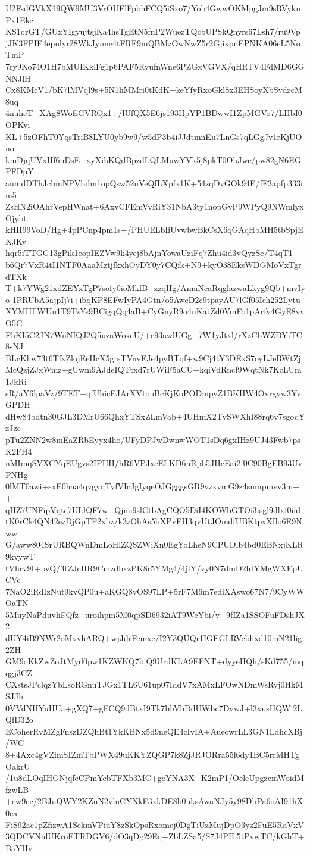 U2FsdGVkX19QW9MU3VrOUFlFpbhFCQ5iSxo7/Yob4GwwOKMpgJm9sRVykuPx1Ekc
KS1qrGT/GUxYIgyujtsjKa4hsTgEtN5fnP2WuezTQcbUPSkQnyrs67Lsh7/ru9Vp
jJK3FPIF4epulyr28WkJynne4tFRF9mQBMzOwNwZ5r2GjixpnEPNKA06eL5NoTmP
7ry9Ko74O1H7bMUIKklFg1p6PAF5RyufnWne6PZGxVGVX/qHRTV4FdMD6GGNNJlH
Cx8KMcV1/bK7lMVql9s+5N1hMMri0tKdK+keYfyRxoGkl8x3EHSoyXbSvdzcM8uq
4nuhcT+XAg8WoEGVRQx1+/lUfQX5E6js193HpYP1BDwwI1ZpMGVo7/LHbI0OPKvi
KL+5zOFhT0YqsTriB8LYU0yb9w9/w5dP3b4iJJdtmnEu7LnGs7qLGgJv1rKjUOno
kmDjqUVxHf6nDsE+xyXihKQdBpzdLQLMuwYVk5j8pkT0ObJwe/pw82gN6EGPFDpY
aumdDThJcbmNPVbdm1opQsw52uVeQfLXpfx1K+54zqDvGOk94E/fF3apfp333rm5
ZsHN2iOAhrVepHWnat+6AxvCFEmVvRiY31NbA3ty1nopGvP9WPyQ9NWmlyxOjybt
kHII99VoD/Hg+4pPCnp4pm1s+/PHUELbIiUvwbwBkCsX6qGAqHbMH5tbSpjEKJKv
hqr5iTTGG13gPik1eopIEZVw9k4yej8bAjnYowaUziFq7Zhu4id3vQyzSe/T4qT1
b6Qr7VxR4tI1NTF0AaaMztjfkxhOyDY0y7CQfk+N9+kyO38EksWDGMoVxTgrdTXk
T+k7YWg21xdZEYxTgP7sofy0ioMkfB+zzqHg/AmaNcaRqglazwaLkyg9Qb+mvIyo
1PRUbA5ajpIj7i+ibqKP8EFwIyPA4Gtn/o5AweD2c9tpayAU7lGf05Ich252Lytu
XYMHIlWUu1T9TzYs9BCigqQq4aB+CyGnyR9o4uKatZd0VmFo1pArfv4GyE8vvO5G
FhKI5C2JN7WuNIQJ2Q5uzaWoxeU/+e93awlUGg+7W1yJtxl/rXzCbWZDYiTC8sNJ
BLcKhw73t6TfxZlojEeHcX5grsTVnvEJe4pyBTqf+w9Cj4tY3DExS7oyLJeRWtZj
McQzjZJxWmz+gUwm9AJdeIQTtxd7rUWiF5aCU+kqiVdRncf9WqtNk7KcLUm1JkRi
sR/aY6lpaVz/9TET+qfUhicEJArXVtouBcKjKoPODmpyZ1BKHW4Ovrgyw3YvGPDH
dHw84bdtn30GJL3DMrU66QhxYTSxZLmVab+4UHmX2TySWXhI88rq6v7sgoqYzJze
pTu2ZNN2w8mEaZRbEyyx4ho/UFyDPJwDwnwWOT1sDq6gxIHz9UJ43Fwb7psK2FH4
nMImqSVXCYqEUgvs2IPHH/hR6VPJxeELKD6nRpb5JHcEai2f0C90BgEB93UvPNHg
0lMT0awi+sxE0haa4qvgyqTyfVIcJgIyqeOJGgggsGR9vzxvmG9z4snmpmvv3m++
qHZ7UNFipVqtc7UIdQF7w+Qjnu9slCtbAgCQO5DiI4KOWbGTOi3isgl9dlxf0iid
tK0rCk4QN42ezDjGpTF2xbz/k3zOhAs5bXPvEH3qvUtJOmdfUBKtpxXIlo6E9Nww
G/aww804SrURBQWnDmLoHlZQSZWiXn0EgYoLheN9CPUDlb4bd0EBNxjKLR9kvywT
tVhrv9I+bvQ/3tZJcHR9CmzdbxzPK8r5YMg4/4jlY/vy0N7dmD2hIYMgWXEpUCVc
7NaO2iRdIzNut9kvQP0u+aKGQ8vOS97LP+5rF7M6m7ediXAswo67N7/9CyWWOaTN
5MuyNaPduvhFQfz+uroihpm5M0qpSD6932iAT9WcYbi/v+9fIZa1SSOFuFDshJX2
dUY4iB9NWr2oMvvhARQ+wjJdrFemxe/I2Y3QUQr1IGEGLRVcbhxd10mN21lig2ZH
GM9oKkZwZoJtMyd0pw1KZWKQ7biQ9UrdKLA9EFNT+dyyeHQh/sKd755/mqqgj3CZ
CXstsJPclqzYbLsoRGnuTJGx1TL6U61up07IddV7xAMxLFOwNDmWsRyj0HkMSJJh
0VVdNHYuHUa+gXQ7+gFCQ9dBtxI9Tk7bhVbDdUWbc7DvwJ+l3xusHQWi2LQfD32o
ECoherRvMZgFnszDZQhBt1YkKBNx5d9neQE4cIvIA+AueowrLL3GN1LdhcXBj/WC
8+4Axc4gVZimSIZmTbPWX49uKKYZQGP7k8ZjJRJORra55l6dy1BC5rrMHTgOakrU
/1u8dLOqIHGNjqfcCPmYcbTFXb3MC+geYNA3X+K2mP1/OcleUpgzcmWoidMfzwLB
+ew9ec/2BJuQWY2KZnN2vluCYNkF3xkDE8b0uksAwaNJy5y98DbPa6oAI91hX0ca
FiS92ac1pZfizwA1SekmVPiuY8zSkOpsRxomej0DgTiUzMujDpO3yz2FuE5RaVxV
3QDCVNulUKroETRDGV6/dO3qDg29Eq+ZbLZSa5/S7J4PIL5tPvwTC/kGhT+BaYHv

